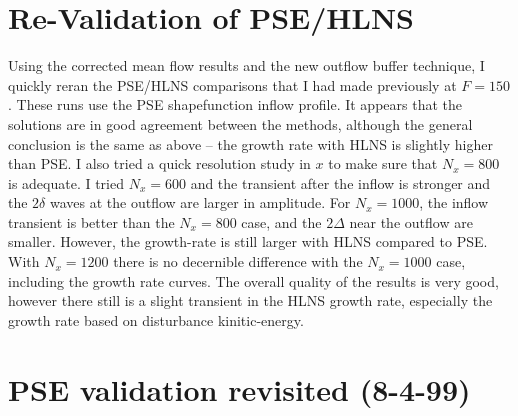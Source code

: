\documentclass[12pt]{article}
\begin{document}
\section{Re-Validation of PSE/HLNS}

Using the corrected mean flow results and the new outflow buffer technique, I
quickly reran the PSE/HLNS comparisons that I had made previously at $F=150$.
These runs use the PSE shapefunction inflow profile.  It appears that the
solutions are in good agreement between the methods, although the general
conclusion is the same as above -- the growth rate with HLNS is slightly
higher than PSE.  I also tried a quick resolution study in $x$ to make sure
that $N_x=800$ is adequate.  I tried $N_x=600$ and the transient after the
inflow is stronger and the $2\delta$ waves at the outflow are larger in
amplitude.  For $N_x=1000$, the inflow transient is better than the $N_x=800$
case, and the $2\Delta$ near the outflow are smaller.  However, the
growth-rate is still larger with HLNS compared to PSE.  With $N_x=1200$ there
is no decernible difference with the $N_x=1000$ case, including the growth
rate curves.  The overall quality of the results is very good, however there
still is a slight transient in the HLNS growth rate, especially the growth
rate based on disturbance kinitic-energy.

\section{PSE validation revisited (8-4-99) }
\end{document}
